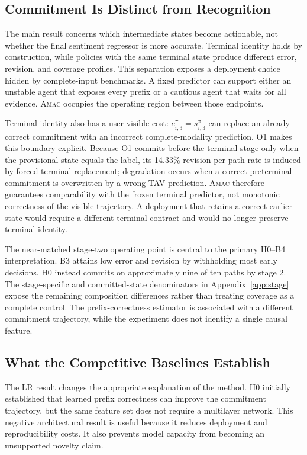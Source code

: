 \documentclass[journal]{IEEEtran}
\newcommand{\method}{\textsc{Amac}}
\begin{document}
\subsection{Commitment Is Distinct from Recognition}

The main result concerns which intermediate states become actionable, not whether the final sentiment regressor is more accurate. Terminal identity holds by construction, while policies with the same terminal state produce different error, revision, and coverage profiles. This separation exposes a deployment choice hidden by complete-input benchmarks. A fixed predictor can support either an unstable agent that exposes every prefix or a cautious agent that waits for all evidence. \method{} occupies the operating region between those endpoints.

Terminal identity also has a user-visible cost: $c_{i,3}^{\pi}=s_{i,3}^{\pi}$ can replace an already correct commitment with an incorrect complete-modality prediction. O1 makes this boundary explicit. Because O1 commits before the terminal stage only when the provisional state equals the label, its 14.33\% revision-per-path rate is induced by forced terminal replacement; degradation occurs when a correct preterminal commitment is overwritten by a wrong TAV prediction. \method{} therefore guarantees comparability with the frozen terminal predictor, not monotonic correctness of the visible trajectory. A deployment that retains a correct earlier state would require a different terminal contract and would no longer preserve terminal identity.

The near-matched stage-two operating point is central to the primary H0--B4 interpretation. B3 attains low error and revision by withholding most early decisions. H0 instead commits on approximately nine of ten paths by stage 2. The stage-specific and committed-state denominators in Appendix~\ref{app:stage} expose the remaining composition differences rather than treating coverage as a complete control. The prefix-correctness estimator is associated with a different commitment trajectory, while the experiment does not identify a single causal feature.

\subsection{What the Competitive Baselines Establish}

The LR result changes the appropriate explanation of the method. H0 initially established that learned prefix correctness can improve the commitment trajectory, but the same feature set does not require a multilayer network. This negative architectural result is useful because it reduces deployment and reproducibility costs. It also prevents model capacity from becoming an unsupported novelty claim.
\end{document}
